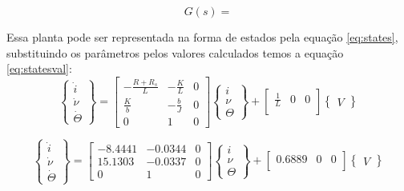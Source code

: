 \documentclass{article}
\begin{document}
\begin{equation}
\label{eq:gs}
G(s)=%
\end{equation}

Essa planta pode ser representada na forma de estados pela equação \ref{eq:states}, substituindo os parâmetros pelos valores calculados temos a equação \ref{eq:statesval}:
\begin{equation}
\label{eq:states}
\begin{Bmatrix}
\dot{i}\\ \dot{\nu} \\ \dot{\Theta} 
\end{Bmatrix} =
\begin{bmatrix}
-\frac{R+R_s}{L} & -\frac{K}{L} & 0\\
\frac{K}{b} & -\frac{b}{J} & 0\\
0 & 1 & 0
\end{bmatrix}
\begin{Bmatrix}
i\\ \nu \\ \Theta 
\end{Bmatrix} + 
\begin{bmatrix}
\frac{1}{L} & 0 & 0\\
\end{bmatrix}
\begin{Bmatrix}
V 
\end{Bmatrix}
\end{equation}

\begin{equation}
\label{eq:statesval}
\begin{Bmatrix}
\dot{i}\\ \dot{\nu} \\ \dot{\Theta} 
\end{Bmatrix} =
\begin{bmatrix}
-8.4441 & -0.0344 & 0\\
15.1303 & -0.0337 & 0\\
0 & 1 & 0
\end{bmatrix}
\begin{Bmatrix}
i\\ \nu \\ \Theta 
\end{Bmatrix} + 
\begin{bmatrix}
0.6889 & 0 & 0\\
\end{bmatrix}
\begin{Bmatrix}
V 
\end{Bmatrix}
\end{equation}
\end{document}

